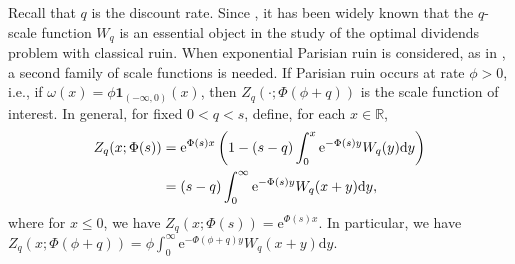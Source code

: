 \documentclass[11pt,reqno]{amsart}
\newtheorem{lemma}{Lemma}[section]
\newcommand{\reals}{\mathbb{R}}
\newcommand{\ind}{\mathbf{1}}
\renewcommand{\leq}{\leqslant}
\begin{document}
Recall that $q$ is the discount rate. Since \cites{avram-et-al_2007,loeffen_2008}, it has been widely known that the $q$-scale function $W_q$ is an essential object in the study of the optimal dividends problem with classical ruin. When exponential Parisian ruin is considered, as in \cite{renaud2019}, a second family of scale functions is needed. If Parisian ruin occurs at rate $\phi>0$, i.e., if $\omega(x) = \phi \ind_{(-\infty,0)}(x)$, then $Z_q (\cdot;\Phi(\phi+q))$ is the scale function of interest. In general, for fixed $0<q<s$, define, for each $x \in \reals$,
\begin{align}
	Z_q (x;\Phi(s)) &= \mathrm{e}^{\Phi(s)x} \left(1-(s-q) \int_0^x \mathrm{e}^{-\Phi(s)y} W_{q}(y) \mathrm{d}y \right)\label{eq:Zq-def} \\
	&= (s-q) \int_0^\infty \mathrm{e}^{-\Phi(s)y} W_{q}(x+y) \mathrm{d}y ,\notag
\end{align}
where for $x \leq 0$, we have $Z_q (x;\Phi(s))=\mathrm{e}^{\Phi(s) x}$.  In particular, we have $Z_q (x;\Phi(\phi+q))= \phi \int_0^\infty \mathrm{e}^{-\Phi(\phi+q)y} W_q(x+y) \mathrm{d}y$.

%
%
%
\end{document}
